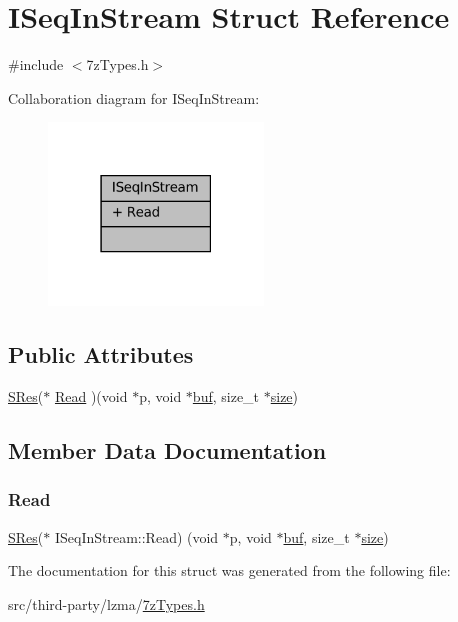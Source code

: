\hypertarget{struct_i_seq_in_stream}{}\section{I\+Seq\+In\+Stream Struct Reference}
\label{struct_i_seq_in_stream}


{\ttfamily \#include $<$7z\+Types.\+h$>$}



Collaboration diagram for I\+Seq\+In\+Stream\+:
\nopagebreak
\begin{figure}[H]
\begin{center}
\leavevmode
\includegraphics[width=162pt]{struct_i_seq_in_stream__coll__graph}
\end{center}
\end{figure}
\subsection*{Public Attributes}
\begin{DoxyCompactItemize}
\item 
\mbox{\hyperlink{7z_types_8h_acc0053eeb62726b68b22e8c7d9e91367}{S\+Res}}($\ast$ \mbox{\hyperlink{struct_i_seq_in_stream_abaf095760ac57ba87a9daa06091c1154}{Read}} )(void $\ast$p, void $\ast$\mbox{\hyperlink{ioapi_8h_a8ad8a13c88886b9f623034ff88570adb}{buf}}, size\+\_\+t $\ast$\mbox{\hyperlink{ioapi_8h_a014d89bd76f74ef3a29c8f04b473eb76}{size}})
\end{DoxyCompactItemize}


\subsection{Member Data Documentation}
\mbox{\label{struct_i_seq_in_stream_abaf095760ac57ba87a9daa06091c1154}} 
\subsubsection{\texorpdfstring{Read}{Read}}
{\footnotesize\ttfamily \mbox{\hyperlink{7z_types_8h_acc0053eeb62726b68b22e8c7d9e91367}{S\+Res}}($\ast$ I\+Seq\+In\+Stream\+::\+Read) (void $\ast$p, void $\ast$\mbox{\hyperlink{ioapi_8h_a8ad8a13c88886b9f623034ff88570adb}{buf}}, size\+\_\+t $\ast$\mbox{\hyperlink{ioapi_8h_a014d89bd76f74ef3a29c8f04b473eb76}{size}})}



The documentation for this struct was generated from the following file\+:\begin{DoxyCompactItemize}
\item 
src/third-\/party/lzma/\mbox{\hyperlink{7z_types_8h}{7z\+Types.\+h}}\end{DoxyCompactItemize}
